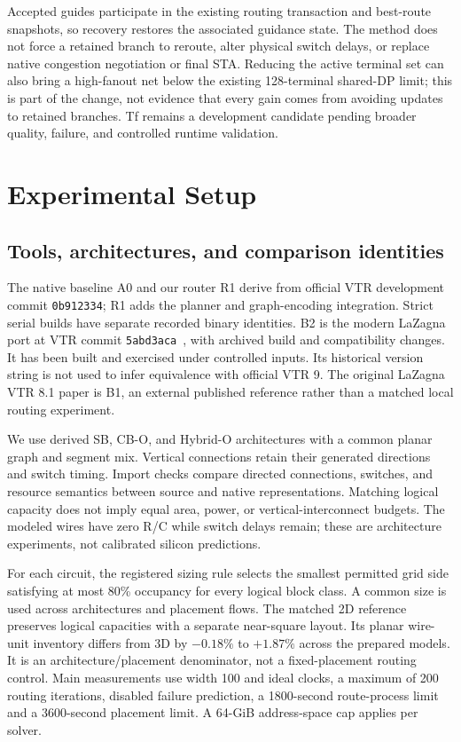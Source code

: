 \documentclass[conference,10pt]{IEEEtran}
\begin{document}
Accepted guides participate in the existing routing transaction and best-route snapshots, so recovery restores the associated guidance state. The method does not force a retained branch to reroute, alter physical switch delays, or replace native congestion negotiation or final STA. Reducing the active terminal set can also bring a high-fanout net below the existing 128-terminal shared-DP limit; this is part of the change, not evidence that every gain comes from avoiding updates to retained branches. Tf remains a development candidate pending broader quality, failure, and controlled runtime validation.

\clearpage
\section{Experimental Setup}
\subsection{Tools, architectures, and comparison identities}
The native baseline A0 and our router R1 derive from official VTR development commit \texttt{0b912334}; R1 adds the planner and graph-encoding integration. Strict serial builds have separate recorded binary identities. B2 is the modern LaZagna port at VTR commit \texttt{5abd3aca}~\cite{modern}, with archived build and compatibility changes. It has been built and exercised under controlled inputs. Its historical version string is not used to infer equivalence with official VTR 9. The original LaZagna VTR 8.1 paper is B1, an external published reference rather than a matched local routing experiment.

We use derived SB, CB-O, and Hybrid-O architectures with a common planar graph and segment mix. Vertical connections retain their generated directions and switch timing. Import checks compare directed connections, switches, and resource semantics between source and native representations. Matching logical capacity does not imply equal area, power, or vertical-interconnect budgets. The modeled wires have zero R/C while switch delays remain; these are architecture experiments, not calibrated silicon predictions.

For each circuit, the registered sizing rule selects the smallest permitted grid side satisfying at most 80\% occupancy for every logical block class. A common size is used across architectures and placement flows. The matched 2D reference preserves logical capacities with a separate near-square layout. Its planar wire-unit inventory differs from 3D by $-0.18\%$ to $+1.87\%$ across the prepared models. It is an architecture/placement denominator, not a fixed-placement routing control. Main measurements use width 100 and ideal clocks, a maximum of 200 routing iterations, disabled failure prediction, a 1800-second route-process limit and a 3600-second placement limit. A 64-GiB address-space cap applies per solver.
\end{document}

